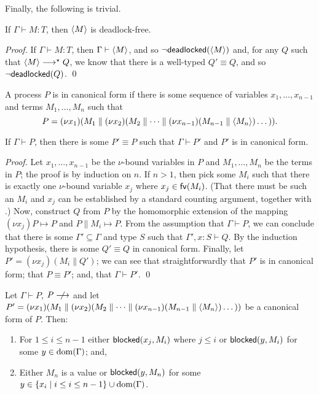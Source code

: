 \documentclass[orivec,envcountsame]{llncs}
\begin{document}
Finally, the following is trivial.

\begin{theorem}\label{thm:typed-terms-df}
  If $\Gamma \vdash M: T$, then $\langle M \rangle$ is deadlock-free.
\end{theorem}

\begin{proof}
  If $\Gamma \vdash M: T$, then $\Gamma \vdash \langle M \rangle$, and so
  $\lnot\mathsf{deadlocked}(\langle M \rangle)$ and, for any $Q$ such that $\langle M \rangle \longrightarrow^\star Q$, we
  know that there is a well-typed $Q' \equiv Q$, and so $\lnot\mathsf{deadlocked}(Q)$. \qed
\end{proof}

\begin{definition}
A process $P$ is in canonical form if there is some sequence of variables $x_1,\dots,x_{n-1}$ and
terms $M_1,\dots,M_n$ such that
\[
  P = (\nu x_1)(M_1 \parallel (\nu x_2)(M_2 \parallel \dots \parallel (\nu x_{n-1})(M_{n-1} \parallel \langle M_n \rangle)\dots)).
\]
\end{definition}

\begin{lemma}\label{thm:canonical}
  If $\Gamma \vdash P$, then there is some $P' \equiv P$ such that $\Gamma \vdash P'$ and $P'$ is in
  canonical form.
\end{lemma}

\begin{proof}
  Let $x_1,\dots,x_{n-1}$ be the $\nu$-bound variables in $P$ and $M_1,\dots,M_n$ be the terms in
  $P$; the proof is by induction on $n$.  If $n > 1$, then pick some $M_i$ such that there is
  exactly one $\nu$-bound variable $x_j$ where $x_j \in \mathsf{fv}(M_i)$.  (That there must be such an
  $M_i$ and $x_j$ can be established by a standard counting argument, together with
  .)  Now, construct $Q$ from $P$ by the homomorphic extension of
  the mapping $(\nu x_j)P \mapsto P$ and $P \parallel M_i \mapsto P$.  From the assumption that
  $\Gamma \vdash P$, we can conclude that there is some $\Gamma' \subseteq \Gamma$ and type $S$ such
  that $\Gamma',x:S \vdash Q$.  By the induction hypothesis, there is some $Q' \equiv Q$ in
  canonical form.  Finally, let $P' = (\nu x_j)(M_i \parallel Q')$; we can see that
  straightforwardly that $P'$ is in canonical form; that $P \equiv P'$; and, that $\Gamma \vdash
  P'$. \qed
\end{proof}

\begin{theorem}\label{thm:progress-open}
  Let $\Gamma \vdash P$, $P \centernot\ceval$ and let $P' = (\nu x_1)(M_1 \parallel (\nu
  x_2)(M_2 \parallel \dots \parallel (\nu x_{n-1})(M_{n-1} \parallel \langle M_n \rangle)\dots))$ be
  a canonical form of $P$.  Then:
  \begin{enumerate}
  \item For $1 \leq i \leq n - 1$ either $\mathsf{blocked}(x_j,M_i)$ where $j \leq i$ or $\mathsf{blocked}(y,M_i)$
    for some $y \in \operatorname{dom}(\Gamma)$; and,
  \item Either $M_n$ is a value or $\mathsf{blocked}(y,M_n)$ for some $y \in \{ x_i \mid i \leq i \leq n -
    1 \} \cup \operatorname{dom}(\Gamma)$.
  \end{enumerate}
\end{theorem}
\end{document}
